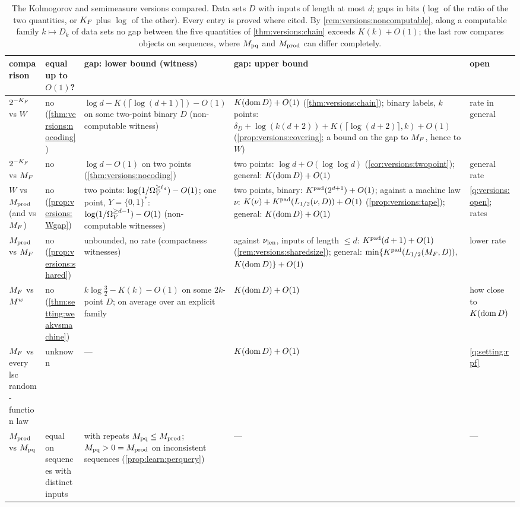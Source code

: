 \begin{table}[!htb]
\crefabbrev
\centering\footnotesize
\renewcommand{\arraystretch}{1.25}
\begin{tabularx}{\textwidth}{@{}>{\raggedright\arraybackslash}p{2.1cm}>{\raggedright\arraybackslash}p{1.65cm}>{\raggedright\arraybackslash}X>{\raggedright\arraybackslash}X>{\raggedright\arraybackslash}p{1.6cm}@{}}
\toprule
comparison & equal up to $O(1)$? & gap: lower bound (witness) & gap: upper bound & open\\
\midrule
$2^{-K_{F}}$ vs $W$ & no (\cref{thm:versions:nocoding}) & $\log d-K(\lceil\log(d+1)\rceil)-O(1)$ on some two-point binary $D$ (non-computable witness) & $K(\operatorname{dom} D)+O(1)$ (\cref{thm:versions:chain}); binary labels, $k$ points: $\delta_D+\log(k(d+2))+K(\lceil\log(d+2)\rceil,k)+O(1)$ (\cref{prop:versions:covering}; a bound on the gap to $M_{F}$, hence to $W$) & rate in general\\
$2^{-K_{F}}$ vs $M_{F}$ & no & $\log d-O(1)$ on two points (\cref{thm:versions:nocoding}) & two points: $\log d+O(\log\log d)$ (\cref{cor:versions:twopoint}); general: $K(\operatorname{dom} D)+O(1)$ & general rate\\
$W$ vs $M_{\mathrm{prod}}$ (and vs $M_{F}$) & no (\cref{prop:versions:Wgap}) & two points: $\log(1/\Omega_{V}^{\ge \ell_d})-O(1)$; one point, $Y=\{0,1\}^*$: $\log(1/\Omega_{V}^{\ge d-1})-O(1)$ (non-computable witnesses) & two points, binary: $K^{\mathrm{pad}}(2^{d+1})+O(1)$; against a machine law $\nu$: $K(\nu)+K^{\mathrm{pad}}(L_{1/2}(\nu,D))+O(1)$ (\cref{prop:versions:tape}); general: $K(\operatorname{dom} D)+O(1)$ & \cref{q:versions:open}; rates\\
$M_{\mathrm{prod}}$ vs $M_{F}$ & no (\cref{prop:versions:shared}) & unbounded, no rate (compactness witnesses) & against $\nu_{\mathrm{len}}$, inputs of length $\le d$: $K^{\mathrm{pad}}(d+1)+O(1)$ (\cref{rem:versions:sharedsize}); general: $\min\{K^{\mathrm{pad}}(L_{1/2}(M_{F},D)),$ $K(\operatorname{dom} D)\}+O(1)$ & lower rate\\
$M_{F}$ vs $M^{w}$ & no (\cref{thm:setting:weakvsmachine}) & $k\log\frac32-K(k)-O(1)$ on some $2k$-point $D$; on average over an explicit family & $K(\operatorname{dom} D)+O(1)$ & how close to $K(\operatorname{dom} D)$\\
$M_{F}$ vs every lsc random-function law & unknown & --- & $K(\operatorname{dom} D)+O(1)$ & \cref{q:setting:rpf}\\
$M_{\mathrm{prod}}$ vs $M_{\mathrm{pq}}$ & equal on sequences with distinct inputs & with repeats $M_{\mathrm{pq}}\le M_{\mathrm{prod}}$; $M_{\mathrm{pq}}>0=M_{\mathrm{prod}}$ on inconsistent sequences (\cref{prop:learn:perquery}) & --- & ---\\
\bottomrule
\end{tabularx}
\caption{The Kolmogorov and semimeasure versions compared. Data sets $D$ with inputs of length at most $d$; gaps in bits ($\log$ of the ratio of the two quantities, or $K_{F}$ plus $\log$ of the other). Every entry is proved where cited. By \cref{rem:versions:noncomputable}, along a computable family $k\mapsto D_k$ of data sets no gap between the five quantities of \cref{thm:versions:chain} exceeds $K(k)+O(1)$; the last row compares objects on sequences, where $M_{\mathrm{pq}}$ and $M_{\mathrm{prod}}$ can differ completely.}
\label{tab:versions:compare}
\end{table}

